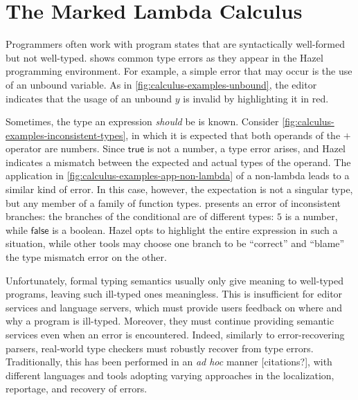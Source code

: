 \section{The Marked Lambda Calculus}
\label{sec:calculus}

Programmers often work with program states that are syntactically well-formed but not well-typed.
 shows common type errors as they appear in the Hazel programming
environment. For example, a simple error that may occur is the use of an unbound variable. As in
\cref{fig:calculus-examples-unbound}, the editor indicates that the usage of an unbound $y$ is
invalid by highlighting it in red.



Sometimes, the type an expression \emph{should} be is known. Consider
\cref{fig:calculus-examples-inconsistent-types}, in which it is expected that both operands of the
$+$ operator are numbers. Since $\textsf{true}$ is not a number, a type error arises, and Hazel
indicates a mismatch between the expected and actual types of the operand. The application in
\cref{fig:calculus-examples-app-non-lambda} of a non-lambda leads to a similar kind of error. In
this case, however, the expectation is not a singular type, but any member of a family of function
types.  presents an error of inconsistent
branches: the branches of the conditional are of different types: $5$ is a number, while
$\textsf{false}$ is a boolean. Hazel opts to highlight the entire expression in such a situation,
while other tools may choose one branch to be ``correct'' and ``blame'' the type mismatch error on
the other.


Unfortunately, formal typing semantics usually only give meaning to well-typed programs, leaving
such ill-typed ones meaningless. This is insufficient for editor services and language servers,
which must provide users feedback on where and why a program is ill-typed. Moreover, they must
continue providing semantic services even when an error is encountered. Indeed, similarly to
error-recovering parsers, real-world type checkers must robustly recover from type errors.
Traditionally, this has been performed in an \emph{ad hoc} manner [citations?], with different
languages and tools adopting varying approaches in the localization, reportage, and recovery of
errors.


